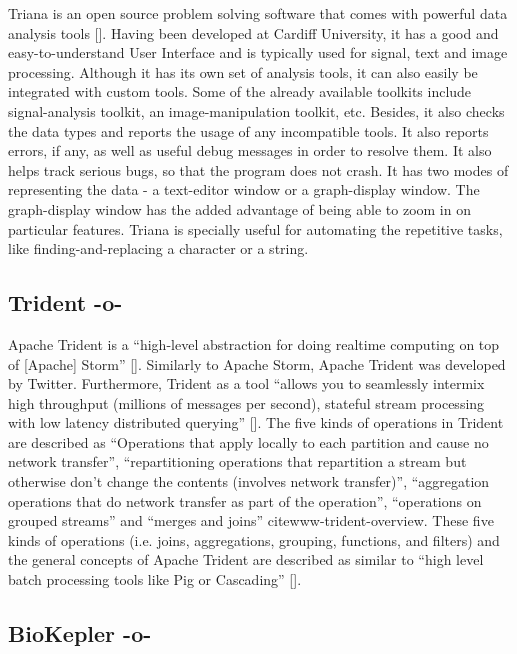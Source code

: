 Triana is an open source problem solving software that comes with
powerful data analysis tools [\cite{trianaDocumentation-1}].  Having
been developed at Cardiff University, it has a good and
easy-to-understand User Interface and is typically used for signal,
text and image processing.  Although it has its own set of analysis
tools, it can also easily be integrated with custom tools.  Some of
the already available toolkits include signal-analysis toolkit, an
image-manipulation toolkit, etc.  Besides, it also checks the data
types and reports the usage of any incompatible tools.  It also
reports errors, if any, as well as useful debug messages in order to
resolve them.  It also helps track serious bugs, so that the program
does not crash.  It has two modes of representing the data - a
text-editor window or a graph-display window.  The graph-display
window has the added advantage of being able to zoom in on particular
features.  Triana is specially useful for automating the repetitive
tasks, like finding-and-replacing a character or a string.
   
\subsection{Trident -o-}

Apache Trident is a ``high-level abstraction for doing realtime
computing on top of [Apache]
Storm'' [\cite{www-trident-tutorial}]. Similarly to Apache Storm, Apache
Trident was developed by Twitter.  Furthermore, Trident as a tool
``allows you to seamlessly intermix high throughput (millions of
messages per second), stateful stream processing with low latency
distributed querying'' [\cite{www-trident-tutorial}].  The five kinds of
operations in Trident are described as ``Operations that apply locally
to each partition and cause no network transfer'', ``repartitioning
operations that repartition a stream but otherwise don't change the
contents (involves network transfer)'', ``aggregation operations that
do network transfer as part of the operation'', ``operations on
grouped streams'' and ``merges and joins'' cite{www-trident-overview}.
These five kinds of operations (i.e. joins, aggregations, grouping,
functions, and filters) and the general concepts of Apache Trident are
described as similar to ``high level batch processing tools like Pig
or Cascading'' [\cite{www-trident-tutorial}].



\subsection{BioKepler -o-}
    
